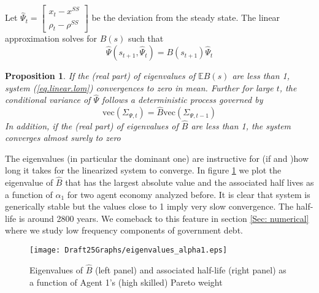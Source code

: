 \documentclass[thmsb,11pt]{article}
\newtheorem{proposition}{Proposition}
\newcommand{\bmat}{\begin{matrix}}
\newcommand{\emat}{\end{matrix}}
\begin{document}
Let $\hat{\Psi}_{t}= \left[\bmat x_{t} - x^{SS}\\ \rho_t - \rho^{SS}\emat\right]$ be the deviation from the steady state. The linear approximation solves for $B(s)$ such that
\begin{equation}
 \hat{\Psi}(s_{t+1},\hat{\Psi}_t)=B(s_{t+1})\hat{\Psi}_t \label{eq.linear.lom}
\end{equation}



\begin{proposition}\label{prop: localstability}
If the (real part) of eigenvalues of $\mathbb{E}B(s)$ are less than 1,  system (\ref{eq.linear.lom}) convergences to zero  in mean. Further for large $t$, the conditional variance of $\hat{\Psi}$ follows a deterministic process governed by 
\[\text{vec}(\Sigma_{\Psi,t})=\hat{B} \text{vec}(\Sigma_{\Psi,t-1})\]	
In addition,  if the (real part) of eigenvalues of $\hat{B}$ are less than 1, the system converges almost surely to zero
\end{proposition}

The eigenvalues (in particular the dominant one) are instructive for (if and )how long it takes for the linearized system to converge. In figure \ref{fig: Eigenvalues} we plot the eigenvalue of $\hat{B}$ that has the largest absolute value  and the associated half lives as a function of $\alpha_1$ for two agent economy analyzed before. It is clear that system is generically
stable but the values close to 1 imply very slow convergence. The half-life is around 2800 years. We comeback to this feature in section \ref{Sec: numerical} where we study low frequency components of government debt.


  \begin{figure}[htp]
 \centering
 \texttt{[image: Draft25Graphs/eigenvalues\_alpha1.eps]}
 \caption{Eigenvalues of $\hat{B}$ (left panel) and associated half-life (right panel) as a function of Agent 1's (high skilled) Pareto weight}
 \label{fig: Eigenvalues}
 \end{figure}
\end{document}
